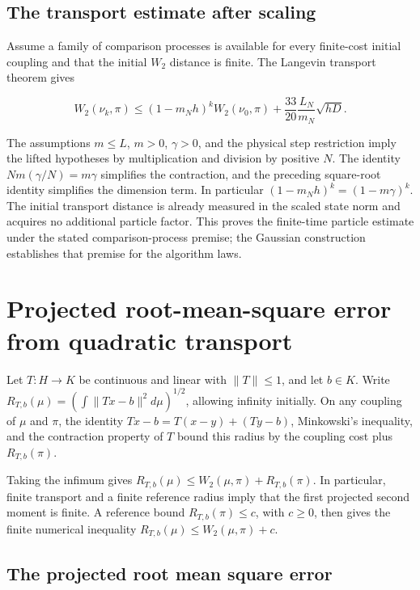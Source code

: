 \documentclass[11pt,a4paper]{article}
\begin{document}
\subsection{\texorpdfstring{The transport estimate after scaling}{The transport estimate after scaling}}


Assume a family of comparison processes is available for every finite-cost initial coupling and that the initial \(W_2\) distance is finite. The Langevin transport theorem gives

\[W_2(\nu_k,\pi)\le(1-m_Nh)^kW_2(\nu_0,\pi)+\frac{33}{20}\frac{L_N}{m_N}\sqrt{hD}.\]

The assumptions \(m\le L\), \(m>0\), \(\gamma>0\), and the physical step restriction imply the lifted hypotheses by multiplication and division by positive \(N\). The identity \(Nm(\gamma/N)=m\gamma\) simplifies the contraction, and the preceding square-root identity simplifies the dimension term. In particular \((1-m_Nh)^k=(1-m\gamma)^k\). The initial transport distance is already measured in the scaled state norm and acquires no additional particle factor. This proves the finite-time particle estimate under the stated comparison-process premise; the Gaussian construction establishes that premise for the algorithm laws.




\section{\texorpdfstring{Projected root-mean-square error from quadratic transport}{Projected root-mean-square error from quadratic transport}}


Let \(T:H\to K\) be continuous and linear with \(\|T\|\le1\), and let \(b\in K\). Write \(R_{T,b}(\mu)=(\int\|Tx-b\|^2d\mu)^{1/2}\), allowing infinity initially. On any coupling of \(\mu\) and \(\pi\), the identity \(Tx-b=T(x-y)+(Ty-b)\), Minkowski's inequality, and the contraction property of \(T\) bound this radius by the coupling cost plus \(R_{T,b}(\pi)\).



Taking the infimum gives \(R_{T,b}(\mu)\le W_2(\mu,\pi)+R_{T,b}(\pi)\). In particular, finite transport and a finite reference radius imply that the first projected second moment is finite. A reference bound \(R_{T,b}(\pi)\le c\), with \(c\ge0\), then gives the finite numerical inequality \(R_{T,b}(\mu)\le W_2(\mu,\pi)+c\).


\subsection{\texorpdfstring{The projected root mean square error}{The projected root mean square error}}
\end{document}

